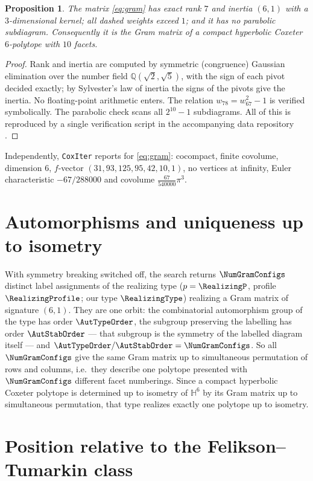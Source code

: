 \documentclass[11pt,reqno]{amsart}
\theoremstyle{plain}
\newtheorem{proposition}[theorem]{Proposition}
\theoremstyle{definition}
\newcommand{\HH}{\mathbb{H}}
\newcommand{\QQ}{\mathbb{Q}}
\begin{document}
\begin{proposition}
\label{prop:gramcheck}
The matrix \eqref{eq:gram} has exact rank $7$ and inertia $(6,1)$ with a
$3$-dimensional kernel; all dashed weights exceed $1$; and it has no parabolic
subdiagram. Consequently it is the Gram matrix of a compact hyperbolic Coxeter
$6$-polytope with $10$ facets.
\end{proposition}
\begin{proof}
Rank and inertia are computed by symmetric (congruence) Gaussian elimination
over the number field $\QQ(\sqrt2,\sqrt5)$, with the sign of each pivot decided
exactly; by Sylvester's law of inertia the signs of the pivots give the inertia.
No floating-point arithmetic enters. The relation $w_{78}=w_{67}^2-1$ is
verified symbolically. The parabolic check scans all $2^{10}-1$ subdiagrams.
All of this is reproduced by a single verification script in the accompanying data repository \cite{RepoPaper}.
\end{proof}

Independently, \texttt{CoxIter} reports for \eqref{eq:gram}: cocompact,
finite covolume, dimension $6$, $f$-vector $(31,93,125,95,42,10,1)$, no vertices
at infinity, Euler characteristic $-67/288000$ and covolume
$\tfrac{67}{540000}\pi^3$.

\section{Automorphisms and uniqueness up to isometry}
With symmetry breaking switched off, the search returns $\NumGramConfigs$ distinct
label assignments of the realizing type ($p=\RealizingP$, profile
$\RealizingProfile$; our type $\RealizingType$) realizing a Gram matrix of signature
$(6,1)$. They are one orbit: the combinatorial automorphism group of the type has
order $\AutTypeOrder$, the subgroup preserving the labelling has order
$\AutStabOrder$ --- that subgroup is the symmetry of the labelled diagram itself ---
and $\AutTypeOrder/\AutStabOrder=\NumGramConfigs$. So all $\NumGramConfigs$ give the
same Gram matrix up to simultaneous permutation of rows and columns, i.e.\ they
describe one polytope presented with $\NumGramConfigs$ different facet numberings. Since a compact hyperbolic Coxeter polytope is determined up
to isometry of $\HH^6$ by its Gram matrix up to simultaneous permutation, that
type realizes exactly one polytope up to isometry.

\section{Position relative to the Felikson--Tumarkin class}
\label{sec:ftclass}
\end{document}
